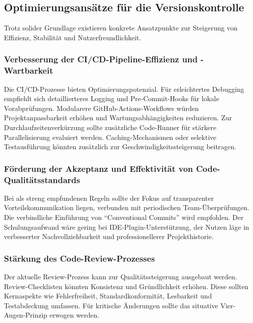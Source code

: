 \documentclass[12pt,oneside]{article}
\begin{document}
    \subsection{Optimierungsansätze für die Versionskontrolle}
    \label{subsec:konzepte_vk}
    Trotz solider Grundlage existieren konkrete Ansatzpunkte zur Steigerung von Effizienz, Stabilität und Nutzerfreundlichkeit.

    \subsubsection{Verbesserung der CI/CD-Pipeline-Effizienz und -Wartbarkeit}
    \label{subsubsec:vk_cicd_optimierung}
    Die CI/CD-Prozesse bieten Optimierungspotenzial. Für erleichtertes Debugging empfiehlt sich detaillierteres Logging und Pre-Commit-Hooks für lokale Vorabprüfungen. Modularere GitHub-Actions-Workflows würden Projektanpassbarkeit erhöhen und Wartungsabhängigkeiten reduzieren. Zur Durchlaufzeitenverkürzung sollte zusätzliche Code-Runner für stärkere Parallelisierung evaluiert werden. Caching-Mechanismen oder selektive Testausführung könnten zusätzlich zur Geschwindigkeitssteigerung beitragen.

    \subsubsection{Förderung der Akzeptanz und Effektivität von Code-Qualitätsstandards}
    \label{subsubsec:vk_code_qualitaet}
    Bei als streng empfundenen Regeln sollte der Fokus auf transparenter Vorteilskommunikation liegen, verbunden mit periodischen Team-Überprüfungen. Die verbindliche Einführung von ``Conventional Commits'' \cite{ConventionalCommitsOrgDe} wird empfohlen. Der Schulungsaufwand wäre gering bei IDE-Plugin-Unterstützung, der Nutzen läge in verbesserter Nachvollziehbarkeit und professionellerer Projekthistorie.

    \subsubsection{Stärkung des Code-Review-Prozesses}
    \label{subsubsec:vk_code_review}
    Der aktuelle Review-Prozess kann zur Qualitätssteigerung ausgebaut werden. Review-Checklisten könnten Konsistenz und Gründlichkeit erhöhen. Diese sollten Kernaspekte wie Fehlerfreiheit, Standardkonformität, Lesbarkeit und Testabdeckung umfassen. Für kritische Änderungen sollte das situative Vier-Augen-Prinzip erwogen werden.
\end{document}
